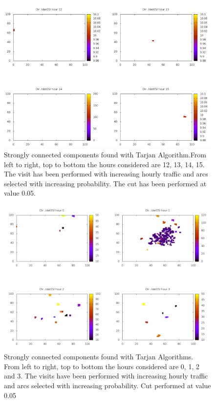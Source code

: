 \documentclass[12pt,a4paper]{article}
\begin{document}
\begin{figure}
\centering
\includegraphics[scale=0.5]{tarjanscc.png}
\caption{Strongly connected components found with Tarjan Algorithm.From left to right, top to bottom the hours considered are 12, 13, 14, 15.
The visit has been performed with increasing hourly traffic and arcs selected with increasing probability. 
The cut has been performed at value 0.05.}
\label{fig:tarjan1}
\end{figure}
\begin{figure}[H]
\centering
\includegraphics[scale=0.6]{tarjanscc2.png}
\caption{Strongly connected components found with Tarjan Algorithms. From left to right, top to bottom the hours considered are 0, 1, 2 and 3.
The visits have been performed with increasing hourly traffic and arcs selected with increasing probability.
Cut performed at value 0.05}
\label{fig:tarjan2}
\end{figure}
\end{document}
